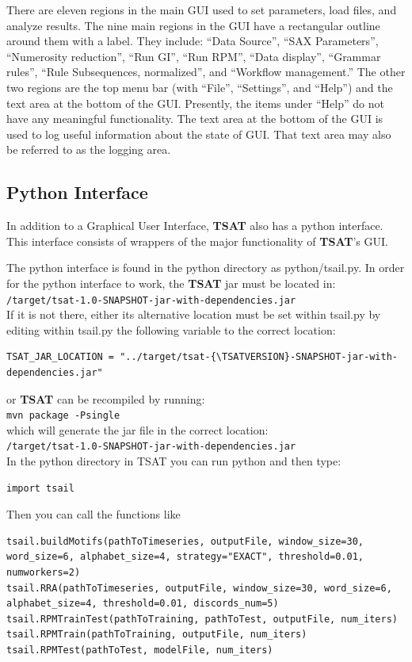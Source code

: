 \documentclass[titlepage, letterpaper, 12pt]{article}
\newcommand\TSAT{\textbf{TSAT}}
\newcommand\TSATVERSION{1.0}
\begin{document}
There are eleven regions in the main GUI used to set parameters, load files, and analyze results.  The nine main regions in the GUI have a rectangular outline around them with a label.  They include: ``Data Source'', ``SAX Parameters'', ``Numerosity reduction'', ``Run GI'', ``Run RPM'', ``Data display'', ``Grammar rules'', ``Rule Subsequences, normalized'', and ``Workflow management.''  The other two regions are the top menu bar (with ``File'', ``Settings'', and ``Help'') and the text area at the bottom of the GUI.  Presently, the items under ``Help'' do not have any meaningful functionality.  The text area at the bottom of the GUI is used to log useful information about the state of GUI.  That text area may also be referred to as the logging area.

\subsection{Python Interface}
\label{introPython}
In addition to a Graphical User Interface, {\TSAT} also has a python interface.  This interface consists of wrappers of the major functionality of {\TSAT}'s GUI. 

The python interface is found in the python directory as python/tsail.py.  In order for the python interface to work, the {\TSAT} jar must be located in:\\ \texttt{/target/tsat-{\TSATVERSION}-SNAPSHOT-jar-with-dependencies.jar}\\
If it is not there, either its alternative location must be set within tsail.py by editing within tsail.py the following variable to the correct location:
\begin{lstlisting}
TSAT_JAR_LOCATION = "../target/tsat-{\TSATVERSION}-SNAPSHOT-jar-with-dependencies.jar"
\end{lstlisting} 
or {\TSAT} can be recompiled by running:\\
\noindent\texttt{mvn package -Psingle}\\
which will generate the jar file in the correct location:\\
\texttt{/target/tsat-{\TSATVERSION}-SNAPSHOT-jar-with-dependencies.jar}\\
In the python directory in TSAT you can run python and then type:
\begin{lstlisting}
import tsail
\end{lstlisting}

Then you can call the functions like
\begin{lstlisting}
tsail.buildMotifs(pathToTimeseries, outputFile, window_size=30, word_size=6, alphabet_size=4, strategy="EXACT", threshold=0.01, numworkers=2)
tsail.RRA(pathToTimeseries, outputFile, window_size=30, word_size=6, alphabet_size=4, threshold=0.01, discords_num=5)
tsail.RPMTrainTest(pathToTraining, pathToTest, outputFile, num_iters)
tsail.RPMTrain(pathToTraining, outputFile, num_iters)
tsail.RPMTest(pathToTest, modelFile, num_iters)
\end{lstlisting}
\end{document}
